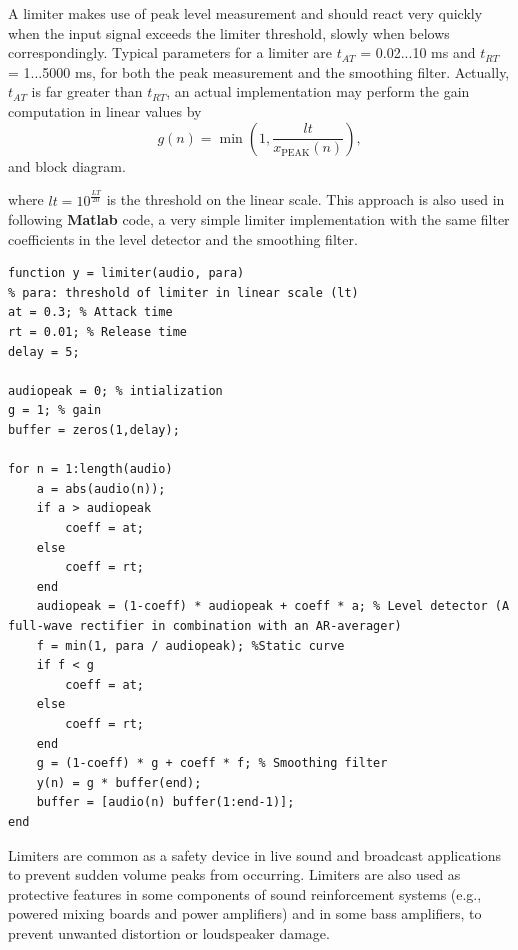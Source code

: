 \documentclass[10pt,a4paper,oneside]{article}
\newcommand{\product}{$\displaystyle \times$}
\begin{document}
A limiter makes use of peak level measurement and should react very quickly when the input signal exceeds the limiter threshold, slowly when belows correspondingly. Typical parameters for a limiter are $t_{AT}$ = 0.02...10 ms and $t_{RT}$ = 1...5000 ms, for both the peak measurement and the smoothing filter. Actually, $t_{AT}$ is far greater than $t_{RT}$, an actual implementation may perform the gain computation in linear values by
\[
g ( n ) = \min \left( 1 , \frac { l t } { x _ { \mathrm { PEAK } } ( n ) } \right),
\]
and block diagram.
\begin{center}
\end{center}
where $lt = 10^{\frac{LT}{20}}$ is the threshold on the linear scale. This approach is also used in following {\bfseries Matlab} code, a very simple limiter implementation with the same filter coefficients in the level detector and the smoothing filter.
\begin{lstlisting}
function y = limiter(audio, para)
% para: threshold of limiter in linear scale (lt)
at = 0.3; % Attack time
rt = 0.01; % Release time
delay = 5;

audiopeak = 0; % intialization
g = 1; % gain
buffer = zeros(1,delay);

for n = 1:length(audio)
	a = abs(audio(n));
	if a > audiopeak
		coeff = at;
	else
		coeff = rt;
	end
	audiopeak = (1-coeff) * audiopeak + coeff * a; % Level detector (A full-wave rectifier in combination with an AR-averager)
	f = min(1, para / audiopeak); %Static curve
	if f < g
		coeff = at;
	else
		coeff = rt;
	end
	g = (1-coeff) * g + coeff * f; % Smoothing filter
	y(n) = g * buffer(end);
	buffer = [audio(n) buffer(1:end-1)];
end
\end{lstlisting}

Limiters are common as a safety device in live sound and broadcast applications to prevent sudden volume peaks from occurring. Limiters are also used as protective features in some components of sound reinforcement systems (e.g., powered mixing boards and power amplifiers) and in some bass amplifiers, to prevent unwanted distortion or loudspeaker damage.
\end{document}
